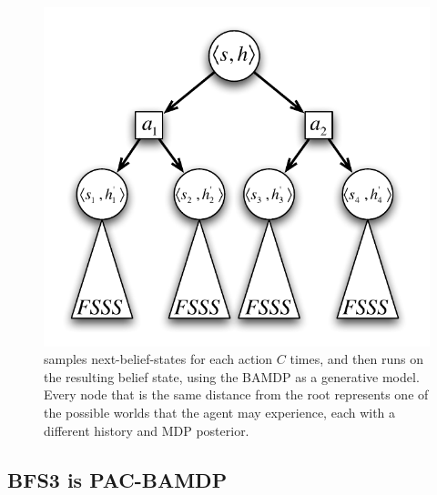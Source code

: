 \begin{figure}
\vskip 0.2in
\begin{center}
\centerline{\includegraphics[scale=0.5]{figures/bfs3}}
\caption{
 samples next-belief-states for each action $C$ times, and then runs  on the resulting belief state, using the BAMDP as a generative model. Every node that is the same distance from the root represents one of the possible worlds that the agent may experience, each with a different history and MDP posterior.
}
\label{fig:bfs3}
\end{center}
\vskip -0.2in
\end{figure} 

\subsection{BFS3 is PAC-BAMDP}
\label{sec:bfs3:pac-bamdp-informal}

